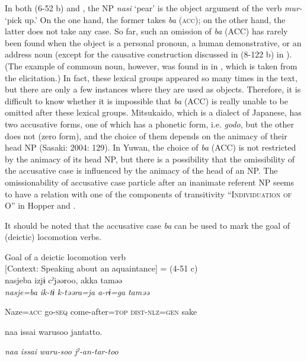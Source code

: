 In both (6-52 b) and , the NP \textit{nasi} ‘pear’ is the object argument of the verb \textit{mur-} ‘pick up.’ On the one hand, the former takes \textit{ba} (\textsc{acc}); on the other hand, the latter does not take any case. So far, such an omission of \textit{ba} (ACC) has rarely been found when the object is a personal pronoun, a human demonstrative, or an address noun (except for the causative construction discussed in (8-122 b) in ). (The example of commoun noun, however, was found in  in , which is taken from the elicitation.) In fact, these lexical groups appeared so many times in the text, but there are only a few instances where they are used as objects. Therefore, it is difficult to know whether it is impossible that \textit{ba} (ACC) is really unable to be omitted after these lexical groups. Mitsukaido, which is a dialect of Japanese, has two accusative forms, one of which has a phonetic form, i.e. \textit{godo}, but the other does not (zero form), and the choice of them depends on the animacy of their head NP (Sasaki: 2004: 129). In Yuwan, the choice of \textit{ba} (ACC) is not restricted by the animacy of its head NP, but there is a possibility that the omissibility of the accusative case is influenced by the animacy of the head of an NP. The omissionability of accusative case particle after an inanimate referent NP seems to have a relation with one of the components of transitivity “I\textsc{ndividuation} \textsc{of} O” in Hopper and \citet[252]{Thompson1980}.

It should be noted that the accusative case \textit{ba} can be used to mark the goal of (deictic) locomotion verbs.

\ea\label{ex:6-54}
 Goal of a deictic locomotion verb\\

 \ea {\TM}  [Context: Speaking about an aquaintance] = (4-51 c)\\
\gll nasjeba  izjɨ  cˀjəəroo,  akka  taməə\\

      \textit{nasje=ba}  \textit{ik-tɨ}  \textit{k-təəra=ja}  \textit{a-rɨ=ga}  \textit{taməə}

      Naze=\textsc{acc}  go-\textsc{seq}  come-after=\textsc{top}  \textsc{dist}-\textsc{nlz}=\textsc{gen}  sake

      naa  issai  warusoo  jantatto.

      \textit{naa}  \textit{issai}  \textit{waru-soo}  \textit{jˀ-an-tar-too}

